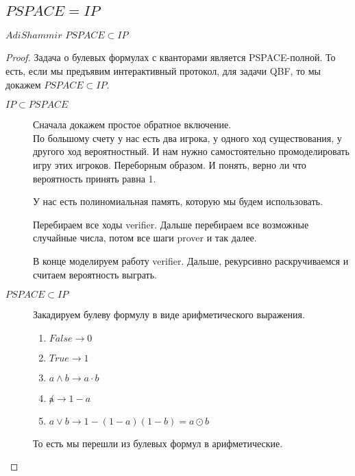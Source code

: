\subsection{$PSPACE = IP$}
\begin{theorem}
	$Adi Shammir$ 
	$PSPACE \subset IP$\\
\end{theorem}

\begin{proof}
	Задача о булевых формулах с кванторами является PSPACE-полной. 
	То есть, если мы предъявим интерактивный протокол, для задачи QBF, 
	то мы докажем $PSPACE \subset IP$.
	\\
	\begin{description}
	\item[$IP \subset PSPACE$]
		Сначала докажем простое обратное включение.\\ 
	
		По большому счету у нас есть два игрока, у одного ход существования, 
		у другого ход вероятностный. И нам нужно самостоятельно промоделировать игру этих игроков. 
		Переборным образом. И понять, верно ли что вероятность принять равна 1.

		У нас есть полиномиальная память, которую мы будем использовать. 

		Перебираем все ходы verifier. Дальше перебираем все возможные случайные числа, потом все шаги prover и так далее.

		В конце моделируем работу verifier. Дальше, рекурсивно раскручиваемся и считаем вероятность выграть. 

	\item[$PSPACE \subset IP$]

		Закадируем булеву формулу в виде арифметического выражения.

		\begin{enumerate}
		\item $False \to 0$\\
		\item $True \to 1$\\
		\item $a \wedge b \to a\cdot b$\\
		\item $\not a \to 1 - a$\\
		\item $a \vee b \to 1 - (1 - a)(1 - b) = a \odot b $\\
		\end{enumerate}
		
		То есть мы перешли из булевых формул в арифметические. 


\end{description}
\end{proof}
